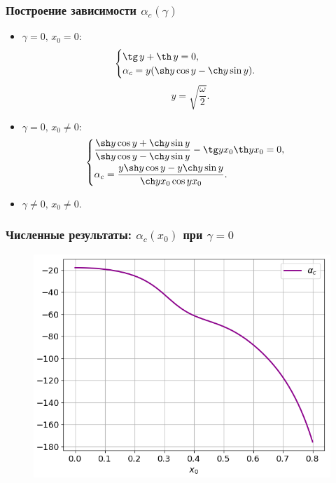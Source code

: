 \documentclass[fullscreen=true, unicode, bookmarks=false]{beamer}
\begin{document}
\begin{frame}
\frametitle{ Построение зависимости $ \alpha_c(\gamma) $ }
 
\begin{itemize}

\item { $ \gamma = 0, \, x_0 = 0: $ 
$$
 \begin{cases}
   \tg \, y + \th \, y = 0, 
   \\
   \alpha_c = y(\sh y \cos y - \ch y \sin y).
 \end{cases}
$$
$$ y = \sqrt{ \frac{\omega}{2} }. $$
}

\item { $ \gamma = 0, \, x_0 \neq 0: $ 
$$
 \begin{cases}
   \dfrac{\sh y \cos y + \ch y \sin y}{\sh y \cos y - \ch y \sin y} - \tg y x_0 \th y x_0 = 0, 
   \vspace{0.1cm}
   \\ 
   \alpha_c = \dfrac{y \sh y \cos y - y \ch y \sin y}{\ch y x_0 \cos y x_0}.
 \end{cases}
$$
}

\item { $ \gamma \neq 0, \, x_0 \neq 0. $ 
}

\end{itemize}	

\end{frame}

\begin{frame}
\frametitle{ Численные результаты: $ \alpha_c(x_0) $ при $ \gamma = 0 $ }

\begin{figure} 
\includegraphics[scale=0.65]{origins.png}  
\end{figure}

\end{frame}
\end{document}
